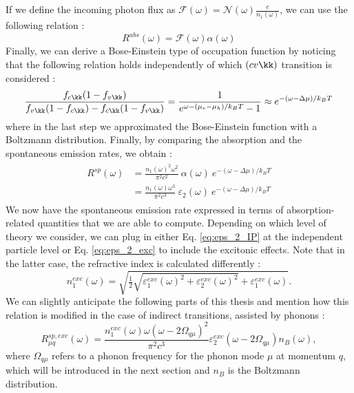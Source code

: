 If we define the incoming photon flux as $\mathcal{F}(\omega) = \mathcal{N}(\omega) \frac{c}{n_1(\omega)}$, we can use the following relation :
\begin{equation}
	R^{abs}(\omega) = \mathcal{F}(\omega) \alpha(\omega)
\end{equation}
Finally, we can derive a Bose-Einstein type of occupation function by noticing that the following relation holds independently of which $(cv\kk)$ transition is considered :
\begin{equation}
	\frac{f_{c\kk} (1-f_{v\kk})}{f_{v\kk} (1-f_{c\kk}) - f_{c\kk}(1-f_{v\kk})} = \frac{1}{e^{\omega - (\mu_e - \mu_h)/k_BT} - 1 }\approx e^{-(\omega - \Delta \mu)/k_BT}
\end{equation}
where in the last step we approximated the Bose-Einstein function with a Boltzmann distribution.
Finally, by comparing the absorption and the spontaneous emission rates, we obtain :
\begin{align}
\begin{split}
	R^{sp}(\omega) &= \frac{n_1(\omega)^2\omega^2}{\pi^2 c^2}\ \alpha(\omega)\ e^{-(\omega - \Delta \mu)/k_BT} \\
	 &= \frac{n_1(\omega)\omega^3}{\pi^2 c^3}\ \varepsilon_2(\omega)\ e^{-(\omega - \Delta \mu)/k_BT} \label{eq:vRS_PL}
\end{split}
\end{align}
We now have the spontaneous emission rate expressed in terms of absorption-related quantities that we are able to compute. Depending on which level of theory we consider, we can plug in either Eq. \eqref{eq:eps_2_IP} at the independent particle level or Eq. \eqref{eq:eps_2_exc} to include the excitonic effects. Note that in the latter case, the refractive index is calculated differently :
\begin{equation}
	 n_1^{exc}(\omega) = \sqrt{\tfrac{1}{2}\sqrt{\varepsilon_1^{exc}(\omega)^2+\varepsilon^{exc}_2(\omega)^2} + \varepsilon^{exc}_1(\omega)}. \label{eq:refrac_index}
\end{equation}	 
We can slightly anticipate the following parts of this thesis and mention how this relation is modified in the case of indirect transitions, assisted by phonons :
\begin{equation}
	R^{sp,exc}_{\mu q}(\omega) = \frac{n_1^{exc}(\omega) \omega(\omega - 2 \Omega_{q\mu})^2}{\pi^2 c^3} \varepsilon^{exc}_2(\omega - 2\Omega_{q\mu})n_{B}(\omega), \label{eq:vRS_PL_ind}
\end{equation}
where $\Omega_{q\mu}$ refers to a phonon frequency for the phonon mode $\mu$ at momentum $q$, which will be introduced in the next section and $n_B$ is the Boltzmann distribution.

